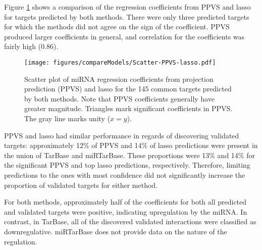 Figure \ref{fig:scatter-ppvs-lasso} shows a comparison of the regression
coefficients from PPVS and lasso for targets predicted by both methods. There
were only three predicted targets for which the methods did not agree on the
sign of the coefficient. PPVS produced larger coefficients in general, and
correlation for the coefficients was fairly high ($0.86$).

\begin{figure}[htb]
  \centering
  \texttt{[image: figures/compareModels/Scatter-PPVS-lasso.pdf]}
  \caption{Scatter plot of miRNA regression coefficients from projection
  prediction (PPVS) and lasso for the 145 common targets predicted by both methods.
  Note that PPVS coefficients generally have greater magnitude. Triangles
  mark significant coefficients in PPVS. The gray
  line marks unity ($x=y$).}
  \label{fig:scatter-ppvs-lasso}
\end{figure}

PPVS and lasso had similar performance in regards of discovering validated
targets: approximately 12\% of PPVS and 14\% of lasso predictions were present
in the union of TarBase and miRTarBase. These proportions were 13\% and 14\% for
the significant PPVS and top lasso predictions, respectively. Therefore,
limiting predictions to the ones with most confidence did not significantly increase
the proportion of validated targets for either method.

For both methods, approximately half of the coefficients for both all
predicted and validated targets were positive, indicating upregulation by the
miRNA. In contrast, in TarBase, all of the discovered validated interactions
were classified as downregulative. miRTarBase does not provide data on the
nature of the regulation.

